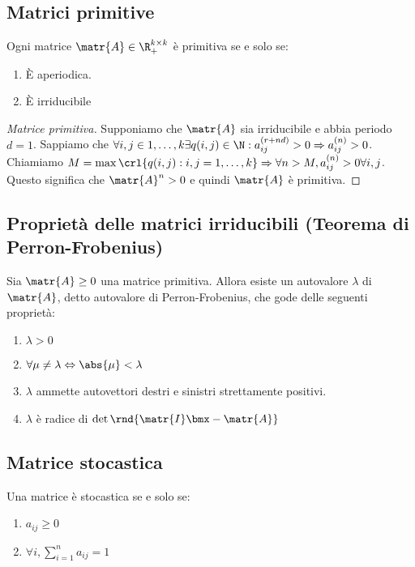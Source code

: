 \documentclass[\main/main.tex]{subfiles}
\begin{document}
\subsection{Matrici primitive}
\begin{definition}
  Ogni matrice \(\matr{A} \in \R^{k\times k}_{+}\) è primitiva se e solo se:
  \begin{enumerate}
    \item È aperiodica.
    \item È irriducibile
  \end{enumerate}
\end{definition}

\begin{proof}[Matrice primitiva]
  Supponiamo che \(\matr{A}\) sia irriducibile e abbia periodo \(d=1\). Sappiamo che \(\forall i,j \in 1, \ldots, k \exists q(i,j) \in \N: a_{ij}^{(r+nd)} >0 \Rightarrow a_{ij}^{(n)} > 0\).
  Chiamiamo \(M = \max\crl{q(i,j): i,j = 1, \ldots, k} \Rightarrow \forall n > M, a_{ij}^{(n)} > 0 \forall i,j\). Questo significa che \(\matr{A}^n>0\) e quindi \(\matr{A}\) è primitiva.
\end{proof}

\subsection{Proprietà delle matrici irriducibili (Teorema di Perron-Frobenius)}

\begin{theorem}
  Sia \(\matr{A} \geq 0\) una matrice primitiva. Allora esiste un autovalore \(\lambda \) di \(\matr{A}\), detto autovalore di Perron-Frobenius, che gode delle seguenti proprietà:
  \begin{enumerate}
    \item \(\lambda > 0\)
    \item \(\forall \mu \neq \lambda \Leftrightarrow \abs{\mu} < \lambda \)
    \item \(\lambda \) ammette autovettori destri e sinistri strettamente positivi.
    \item \(\lambda \) è radice di \(\det\rnd{\matr{I}\bmx - \matr{A}}\)
  \end{enumerate}
\end{theorem}

\subsection{Matrice stocastica}
Una matrice è stocastica se e solo se:
\begin{enumerate}
  \item \(a_{ij} \geq 0\)
  \item \(\forall i, \sum_{i=1}^n a_{ij} = 1\)
\end{enumerate}
\end{document}
